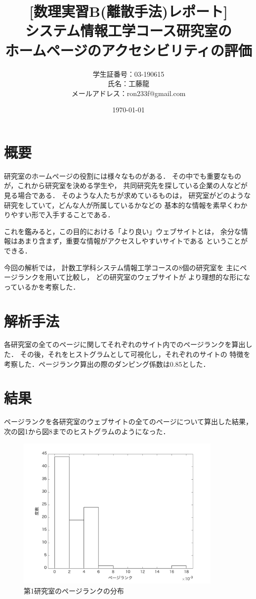 \documentclass[10pt]{jarticle}
\title{[数理実習B(離散手法)レポート]\\システム情報工学コース研究室の\\ホームページのアクセシビリティの評価}
\author{学生証番号：03-190615\\氏名：工藤龍\\メールアドレス：ron233f@gmail.com}
\date{\today}
\begin{document}
\maketitle

\section{概要}
研究室のホームページの役割には様々なものがある．
その中でも重要なものが，これから研究室を決める学生や，
共同研究先を探している企業の人などが見る場合である．
そのような人たちが求めているものは，
研究室がどのような研究をしていて，どんな人が所属しているかなどの
基本的な情報を素早くわかりやすい形で入手することである．

これを鑑みると，この目的における「より良い」ウェブサイトとは，
余分な情報はあまり含まず，重要な情報がアクセスしやすいサイトである
ということができる．

今回の解析では，
計数工学科システム情報工学コースの8個の研究室を
主にページランクを用いて比較し，
どの研究室のウェブサイトが
より理想的な形になっているかを考察した．

\section{解析手法}
各研究室の全てのページに関してそれぞれのサイト内でのページランクを算出した．
その後，それをヒストグラムとして可視化し，それぞれのサイトの
特徴を考察した．ページランク算出の際のダンピング係数は0.85とした．

\section{結果}
ページランクを各研究室のウェブサイトの全てのページについて算出した結果，
次の図1から図8までのヒストグラムのようになった．

\begin{figure}[H]
  \begin{center}
  \includegraphics[width=10cm]{../histograms/i1.png}
  \caption{第1研究室のページランクの分布}
  \end{center}
\end{figure}
\end{document}
